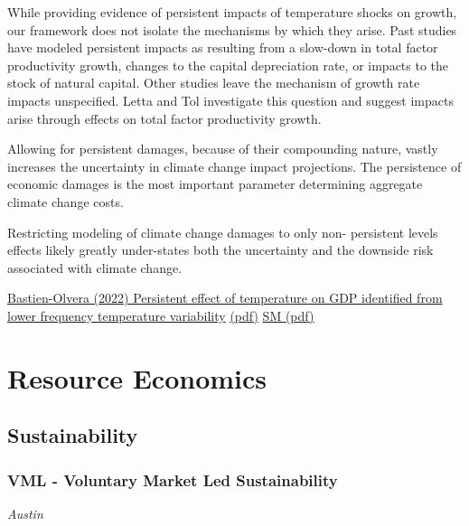 \documentclass[
]{book}
\begin{document}
While providing evidence of persistent impacts of
temperature shocks on growth, our framework does
not isolate the mechanisms by which they arise. Past
studies have modeled persistent impacts as resulting
from a slow-down in total factor productivity growth,
changes to the capital depreciation rate,
or impacts to the stock of natural capital. Other
studies leave the mechanism of growth rate impacts
unspecified. Letta and Tol investigate this
question and suggest impacts arise through effects
on total factor productivity growth.

Allowing for persistent damages, because
of their compounding nature, vastly increases the
uncertainty in climate change impact projections.
The persistence of economic damages is the most
important parameter determining aggregate climate
change costs.

Restricting
modeling of climate change damages to only non-
persistent levels effects likely greatly under-states both
the uncertainty and the downside risk associated with
climate change.

\href{https://iopscience.iop.org/article/10.1088/1748-9326/ac82c2}{Bastien-Olvera (2022) Persistent effect of temperature on GDP identified from lower frequency temperature variability}
\href{pdf/Bastien-Olvera_2022_Persistent_Temperature_Effects.pdf}{(pdf)}
\href{pdf/Bastien-Olvera_2022_Persistent_Temperature_Effects_SM.pdf}{SM (pdf)}

\hypertarget{resource-economics}{%
\chapter{Resource Economics}\label{resource-economics}}

\hypertarget{sustainability}{%
\section{Sustainability}\label{sustainability}}

\hypertarget{vml---voluntary-market-led-sustainability}{%
\subsection{VML - Voluntary Market Led Sustainability}\label{vml---voluntary-market-led-sustainability}}

\emph{Austin}
\end{document}
